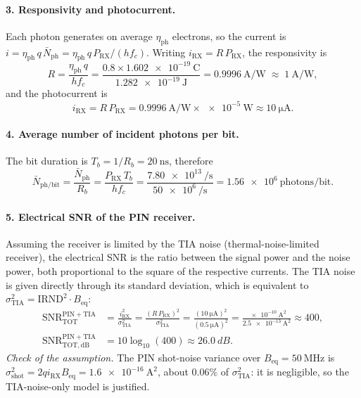 \paragraph{3. Responsivity and photocurrent.}
Each photon generates on average $\eta_\mathrm{ph}$ electrons, so the current is
$i = \eta_\mathrm{ph}\, q\, \bar N_\mathrm{ph} = \eta_\mathrm{ph}\, q\, P_\mathrm{RX}/(h f_c)$.
Writing $i_\mathrm{RX} = R\, P_\mathrm{RX}$, the responsivity is
\begin{equation}
  R = \frac{\eta_\mathrm{ph}\, q}{h f_c}
  = \frac{0.8\times\SI{1.602e-19}{\coulomb}}{\SI{1.282e-19}{\joule}}
  = \SI{0.9996}{\ampere\per\watt} \;\approx\; \SI{1}{\ampere\per\watt},
\end{equation}
and the photocurrent is
\begin{equation}
  i_\mathrm{RX} = R\, P_\mathrm{RX} = \SI{0.9996}{\ampere\per\watt}\times\SI{e-5}{\watt}
  \approx \SI{10}{\micro\ampere}.
\end{equation}

\paragraph{4. Average number of incident photons per bit.}
The bit duration is $T_b = 1/R_b = \SI{20}{\nano\second}$, therefore
\begin{equation}
  \bar N_\mathrm{ph/bit} = \frac{\bar N_\mathrm{ph}}{R_b} = \frac{P_\mathrm{RX}\,T_b}{h f_c}
  = \frac{\SI{7.80e13}{\per\second}}{\SI{50e6}{\per\second}}
  = \num{1.56e6}\ \text{photons/bit}.
\end{equation}

\paragraph{5. Electrical SNR of the PIN receiver.}
Assuming the receiver is limited by the TIA noise (thermal-noise-limited receiver),
the electrical SNR is the ratio between the signal power and the noise power,
both proportional to the square of the respective currents. The TIA noise is given directly through its
standard deviation, which is equivalent to $\sigma_\mathrm{TIA}^2 = \mathrm{IRND}^2\cdot B_\mathrm{eq}$:
\begin{equation}
\begin{aligned}
  \mathrm{SNR}^\mathrm{PIN+TIA}_\mathrm{TOT} &= \frac{i_\mathrm{RX}^2}{\sigma_\mathrm{TIA}^2}
  = \frac{(R\,P_\mathrm{RX})^2}{\sigma_\mathrm{TIA}^2}
  = \frac{(\SI{10}{\micro\ampere})^2}{(\SI{0.5}{\micro\ampere})^2}
  = \frac{\SI{e-10}{\ampere\squared}}{\SI{2.5e-13}{\ampere\squared}}
  \approx 400, \\
  \mathrm{SNR}^\mathrm{PIN+TIA}_\mathrm{TOT,dB} &= 10\log_{10}(400) \approx \SI{26.0}{dB}.
\end{aligned}
\end{equation}
\emph{Check of the assumption.} The PIN shot-noise variance over $B_\mathrm{eq}=\SI{50}{\mega\hertz}$ is
$\sigma_\mathrm{shot}^2 = 2qi_\mathrm{RX}B_\mathrm{eq} = \SI{1.6e-16}{\ampere\squared}$,
about $0.06\%$ of $\sigma_\mathrm{TIA}^2$: it is negligible, so the TIA-noise-only
model is justified.

